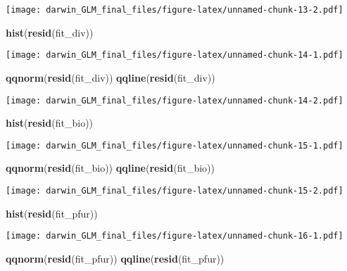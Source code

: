\documentclass[]{article}
\newenvironment{Shaded}{\begin{snugshade}}{\end{snugshade}}
\newcommand{\KeywordTok}[1]{\textcolor[rgb]{0.13,0.29,0.53}{\textbf{#1}}}
\newcommand{\NormalTok}[1]{#1}
\begin{document}
\texttt{[image: darwin\_GLM\_final\_files/figure-latex/unnamed-chunk-13-2.pdf]}

\begin{Shaded}
\begin{Highlighting}[]
\KeywordTok{hist}\NormalTok{(}\KeywordTok{resid}\NormalTok{(fit_div))}
\end{Highlighting}
\end{Shaded}

\texttt{[image: darwin\_GLM\_final\_files/figure-latex/unnamed-chunk-14-1.pdf]}

\begin{Shaded}
\begin{Highlighting}[]
\KeywordTok{qqnorm}\NormalTok{(}\KeywordTok{resid}\NormalTok{(fit_div))}
\KeywordTok{qqline}\NormalTok{(}\KeywordTok{resid}\NormalTok{(fit_div))}
\end{Highlighting}
\end{Shaded}

\texttt{[image: darwin\_GLM\_final\_files/figure-latex/unnamed-chunk-14-2.pdf]}

\begin{Shaded}
\begin{Highlighting}[]
\KeywordTok{hist}\NormalTok{(}\KeywordTok{resid}\NormalTok{(fit_bio))}
\end{Highlighting}
\end{Shaded}

\texttt{[image: darwin\_GLM\_final\_files/figure-latex/unnamed-chunk-15-1.pdf]}

\begin{Shaded}
\begin{Highlighting}[]
\KeywordTok{qqnorm}\NormalTok{(}\KeywordTok{resid}\NormalTok{(fit_bio))}
\KeywordTok{qqline}\NormalTok{(}\KeywordTok{resid}\NormalTok{(fit_bio))}
\end{Highlighting}
\end{Shaded}

\texttt{[image: darwin\_GLM\_final\_files/figure-latex/unnamed-chunk-15-2.pdf]}

\begin{Shaded}
\begin{Highlighting}[]
\KeywordTok{hist}\NormalTok{(}\KeywordTok{resid}\NormalTok{(fit_pfur))}
\end{Highlighting}
\end{Shaded}

\texttt{[image: darwin\_GLM\_final\_files/figure-latex/unnamed-chunk-16-1.pdf]}

\begin{Shaded}
\begin{Highlighting}[]
\KeywordTok{qqnorm}\NormalTok{(}\KeywordTok{resid}\NormalTok{(fit_pfur))}
\KeywordTok{qqline}\NormalTok{(}\KeywordTok{resid}\NormalTok{(fit_pfur))}
\end{Highlighting}
\end{Shaded}
\end{document}
